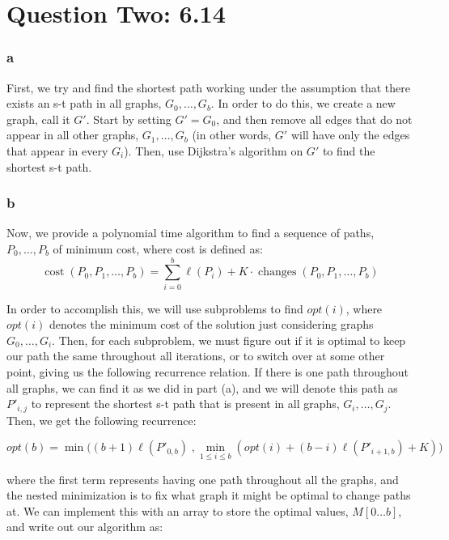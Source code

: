 \documentclass[11pt,letterpaper]{article}
\begin{document}
\section*{Question Two: 6.14}
\subsubsection*{a}
First, we try and find the shortest path working under the assumption that there exists an s-t path in all graphs, $G_0,\ldots,G_b$. In order to do this, we create a new graph, call it $G'$. Start by setting $G'=G_0$, and then remove all edges that do not appear in all other graphs, $G_1,\ldots,G_b$ (in other words, $G'$ will have only the edges that appear in every $G_i$). Then, use Dijkstra's algorithm on $G'$ to find the shortest s-t path.

\subsubsection*{b}
Now, we provide a polynomial time algorithm to find a sequence of paths, $P_0,\ldots,P_b$ of minimum cost, where cost is defined as:
$$\operatorname { cost } \left( P _ { 0 } , P _ { 1 } , \ldots , P _ { b } \right) = \sum _ { i = 0 } ^ { b } \ell \left( P _ { i } \right) + K \cdot \operatorname { changes } \left( P _ { 0 } , P _ { 1 } , \ldots , P _ { b } \right)$$

In order to accomplish this, we will use subproblems to find $opt(i)$, where $opt(i)$ denotes the minimum cost of the solution just considering graphs $G_0,\ldots,G_i$. Then, for each subproblem, we must figure out if it is optimal to keep our path the same throughout all iterations, or to switch over at some other point, giving us the following recurrence relation. If there is one path throughout all graphs, we can find it as we did in part (a), and we will denote this path as $P'_{i,j}$ to represent the shortest s-t path that is present in all graphs, $G_i, \ldots, G_j$. Then, we get the following recurrence:

$$ opt(b) = \min \Big( (b+1) \ell(P'_{0,b}) \; , \min_{1\leq i \leq b} ( opt(i) + (b-i)\ell(P'_{i+1,b}) + K  )      \Big)  $$

where the first term represents having one path throughout all the graphs, and the nested minimization is to fix what graph it might be optimal to change paths at. We can implement this with an array to store the optimal values, $M[0 \ldots b]$, and write out our algorithm as:

\begin{algorithm}[H]
\end{algorithm}
\end{document}

